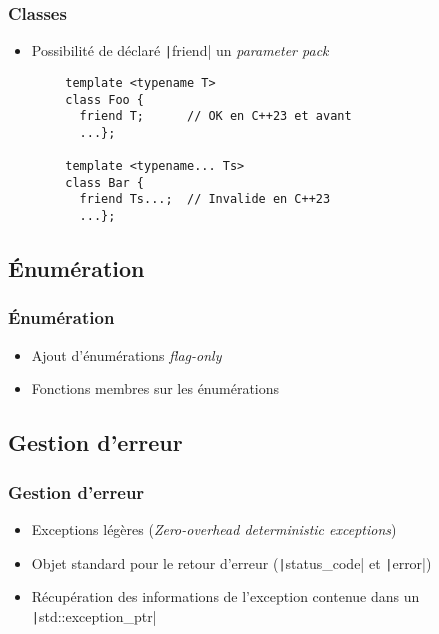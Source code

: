 \documentclass[C++.tex]{subfiles}
\begin{document}
\begin{frame}[fragile]
	\frametitle{Classes}
	\begin{itemize}
		\item Possibilité de déclaré \texttt|friend| un \textit{parameter pack}
	\end{itemize}

	\begin{verbatim}
		template <typename T>
		class Foo {
		  friend T;      // OK en C++23 et avant
		  ...};

		template <typename... Ts>
		class Bar {
		  friend Ts...;  // Invalide en C++23
		  ...};
	\end{verbatim}
\end{frame}

\subsection*{Énumération}
\begin{frame}[fragile]
	\frametitle{Énumération}
	\begin{itemize}
		\item Ajout d'énumérations \og{}\textit{flag-only}\fg{}
		\item Fonctions membres sur les énumérations

	\end{itemize}
\end{frame}

\subsection*{Gestion d'erreur}
\begin{frame}[fragile]
	\frametitle{Gestion d'erreur}
	\begin{itemize}
		\item Exceptions légères (\textit{Zero-overhead deterministic exceptions})
		\item Objet standard pour le retour d'erreur (\texttt|status_code| et \texttt|error|)
		\item Récupération des informations de l'exception contenue dans un \texttt|std::exception_ptr|
	\end{itemize}
\end{frame}
\end{document}
